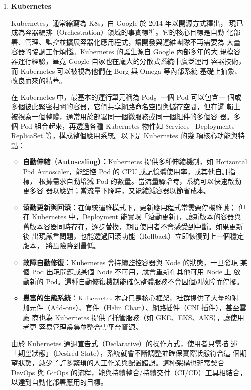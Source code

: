 \documentclass[12pt,a4paper]{article}
\begin{document}
\begin{enumerate}[label={(\zhdig*)}, leftmargin=2\parindent, listparindent=\parindent]
\begin{enumerate}[label={(\arabic*)}, leftmargin=\parindent, listparindent=\parindent]
\item\textbf{
Kubernetes
}

Kubernetes，通常縮寫為 K8s，由 Google 於 2014 年以開源方式釋出，
現已成為容器編排（Orchestration）領域的事實標準。它的核心目標是自動
化部署、管理、監控並擴展容器化應用程式，讓開發與運維團隊不再需要為
大量容器的協調工作煩惱。Kubernetes 的誕生源自 Google 內部多年的大
規模容器運行經驗，畢竟 Google 自家也在龐大的分散式系統中廣泛運用
容器技術，而 Kubernetes 可以被視為他們在 Borg 與 Omega 等內部系統
基礎上抽象、改良而來的精華。

在 Kubernetes 中，最基本的運行單元稱為 Pod。一個 Pod 可以包含一
個或多個彼此緊密相關的容器，它們共享網路命名空間與儲存空間，但在邏
輯上被視為一個整體，通常用於部署同一個微服務或同一個組件的多個容
器。多個 Pod 組合起來，再透過各種 Kubernetes 物件如 Service、
Deployment、ReplicaSet 等，構成整個應用系統。以下是 Kubernetes 的幾
項核心功能與特點：

\begin{itemize}[leftmargin=\parindent, listparindent=\parindent]
\item\textbf{
自動伸縮（Autoscaling）：}Kubernetes 提供多種伸縮機制，如 Horizontal
Pod Autoscaler，能監控 Pod 的 CPU 或記憶體使用率，或其他自訂指標，
根據需求自動增減 Pod 的數量。當流量驟增時，系統可以快速啟動更多容
器以應對；當流量下降時，又能縮減容器以節省成本。

    \item\textbf{
滾動更新與回滾：}在傳統運維模式下，更新應用程式常需要停機維護；
但在 Kubernetes 中，Deployment 能實現「滾動更新」，讓新版本的容器與
舊版本容器同時存在，逐步替換，期間使用者不會感受到中斷。如果更新後
出現嚴重問題，也能透過回滾功能（Rollback）立即恢復到上一個穩定版本，
將風險降到最低。

    \item\textbf{
故障自動修復：}Kubernetes 會持續監控容器與 Node 的狀態，一旦發現
某個 Pod 出現問題或某個 Node 不可用，就會重新在其他可用 Node 上
啟動新的 Pod。這種自動修復機制能確保整體服務不會因個別故障而停擺。

    \item\textbf{
豐富的生態系統：}Kubernetes 本身只是核心框架，社群提供了大量的附
加元件（Add-ons）、套件（Helm Chart）、網路插件（CNI 插件），甚至雲廠
商也為 Kubernetes 提供了托管服務（如 GKE、EKS、AKS），讓使用者更
容易管理叢集並整合雲平台資源。

\end{itemize}

由於 Kubernetes 通過宣告式（Declarative）的操作方式，使用者只需描
述「期望狀態」（Desired State），系統就會不斷調整並確保實際狀態符合這
個期望狀態，減少了許多繁瑣的人工作業與配置錯誤。這種架構也非常契合
DevOps 與 GitOps 的流程，能與持續整合/持續交付（CI/CD）工具相結合，
以達到自動化部署應用的目標。


\end{enumerate}
\end{enumerate}
\end{document}
